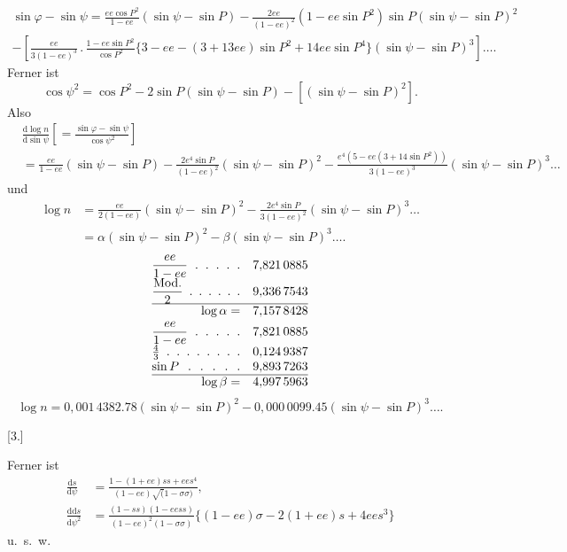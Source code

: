 \noindent [oder]
\[
\begin{gathered}
\sin\varphi-\sin\psi=\frac{ee\cos P^2}{1-ee}(\sin\psi-\sin P)
-\frac{2ee}{(1-ee)^2}(1-ee\sin P^2)\sin P(\sin\psi-\sin P)^2\\
-\left[\frac{ee}{3(1-ee)^3}\,.\,\frac{1-ee\sin P^2}{\cos P^2}
\{3-ee-(3+13ee)\sin P^2+14ee\sin P^4\}(\sin\psi-\sin P)^3\right]\ldots.
\end{gathered}
\]
\noindent Ferner ist
\[
\cos\psi^2=\cos P^2-2\sin P(\sin\psi-\sin P)-[(\sin\psi-\sin P)^2].
\]
\noindent Also
\[
\begin{aligned}
&\frac{\mathrm d\log n}{\mathrm d\sin\psi}
\left[=\frac{\sin\varphi-\sin\psi}{\cos\psi^2}\right]\\
&=\frac{ee}{1-ee}(\sin\psi-\sin P)-\frac{2e^4\sin P}{(1-ee)^2}(\sin\psi-\sin P)^2
-\frac{e^4(5-ee(3+14\sin P^2))}{3(1-ee)^3}(\sin\psi-\sin P)^3\ldots
\end{aligned}
\]
\noindent und
\[
\begin{aligned}
\log n
&=\frac{ee}{2(1-ee)}(\sin\psi-\sin P)^2
-\frac{2e^4\sin P}{3(1-ee)^2}(\sin\psi-\sin P)^3\ldots\\
&=\alpha(\sin\psi-\sin P)^2-\beta(\sin\psi-\sin P)^3\ldots.
\end{aligned}
\]
\noindent [Für den Abplattungswerth \(\frac1{303{,}45..}\) und \(P=51^\circ31'48''{,}70\) ist]
\[
\begin{array}{@{}r@{\quad}l@{}}
\makebox[25mm][s]{\(\displaystyle\frac{ee}{1-ee}\)\hfill .\hfill .\hfill .\hfill .\hfill .}
&7{,}821\,0885\\[.7ex]
\makebox[25mm][s]{\(\displaystyle\frac{\mathrm{Mod.}}2\)\hfill .\hfill .\hfill .\hfill .\hfill .\hfill .}
&9{,}336\,7543\\[.7ex]\hline
\log\alpha=&7{,}157\,8428\\[.5ex]
\makebox[25mm][s]{\(\displaystyle\frac{ee}{1-ee}\)\hfill .\hfill .\hfill .\hfill .\hfill .}
&7{,}821\,0885\\[.7ex]
\makebox[25mm][s]{\(\tfrac43\)\hfill .\hfill .\hfill .\hfill .\hfill .\hfill .\hfill .\hfill .}
&0{,}124\,9387\\
\makebox[25mm][s]{\(\sin P\)\hfill .\hfill .\hfill .\hfill .\hfill .}
&9{,}893\,7263\\\hline
\log\beta=&4{,}997\,5963
\end{array}
\]
\[
\log n=0{,}001\,4382.78(\sin\psi-\sin P)^2-0{,}000\,0099.45(\sin\psi-\sin P)^3\ldots.
\]

\begin{center}[3.]\end{center}
Ferner ist
\[
\begin{aligned}
\frac{\mathrm ds}{\mathrm d\psi}
&=\frac{1-(1+ee)ss+ees^4}{(1-ee)\surd(1-\sigma\sigma)},\\
\frac{\mathrm{dd}s}{\mathrm d\psi^2}
&=\frac{(1-ss)(1-eess)}{(1-ee)^2(1-\sigma\sigma)}
\{(1-ee)\sigma-2(1+ee)s+4ees^3\}
\end{aligned}
\]
\noindent\hfill u.\ s.\ w.\hfill\null\par

